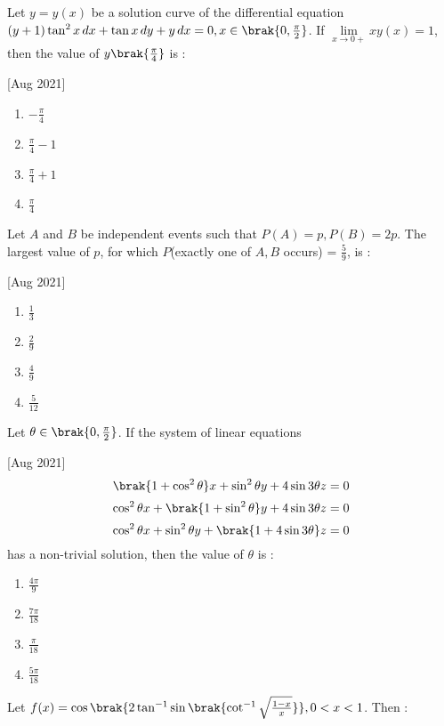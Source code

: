     \item Let $y=y(x)$ be a solution curve of the differential equation $(y+1)\tan^2{x}\,dx + \tan{x}\,dy + y\,dx=0, x\in\brak{0,\frac{\pi}{2}}$. If $\lim\limits_{x\to0+}xy(x)=1$, then the value of $y\brak{\frac{\pi}{4}}$ is :
    
    \hfill[Aug 2021]
        \begin{enumerate}
            \item $-\frac{\pi}{4}$
            \item $\frac{\pi}{4}-1$
            \item $\frac{\pi}{4}+1$
            \item $\frac{\pi}{4}$
        \end{enumerate}

    \item Let $A$ and $B$ be independent events such that $P(A) = p, P(B) = 2p$. The largest value of $p$, for which $P$(exactly one of $A, B$ occurs) = $\frac{5}{9}$, is :
    
    \hfill[Aug 2021]
        \begin{enumerate}
            \item $\frac{1}{3}$
            \item $\frac{2}{9}$
            \item $\frac{4}{9}$
            \item $\frac{5}{12}$
        \end{enumerate}

    \item Let $\theta\in\brak{0,\frac{\pi}{2}}$. If the system of linear equations
    
    \hfill[Aug 2021]
            $$\brak{1+\cos^2{\theta}}x+\sin^2{\theta}y+4\sin{3\theta}z=0$$
            $$\cos^2{\theta}x+\brak{1+\sin^2{\theta}}y+4\sin{3\theta}z=0$$
            $$\cos^2{\theta}x+\sin^2{\theta}y+\brak{1+4\sin{3\theta}}z=0$$
        has a non-trivial solution, then the value of $\theta$ is :
        \begin{enumerate}
            \item $\frac{4\pi}{9}$
            \item $\frac{7\pi}{18}$
            \item $\frac{\pi}{18}$
            \item $\frac{5\pi}{18}$
        \end{enumerate}

    \item Let $f(x)=\cos\brak{2\tan^{-1}\sin\brak{\cot^{-1}\sqrt{\frac{1-x}{x}}}}, 0<x<1$. Then :
    
